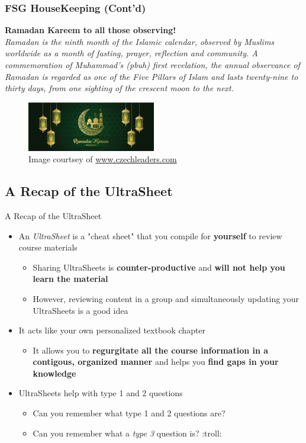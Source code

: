 \documentclass[hyperref={colorlinks,citecolor=blue,linkcolor=blue,urlcolor=blue}, aspectratio=1610]{beamer}
\begin{document}
\begin{frame}
  \frametitle{FSG HouseKeeping (Cont'd)}
  \textbf{Ramadan Kareem to all those observing!}\\
  \textit{Ramadan is the ninth month of the Islamic calendar, observed by Muslims worldwide as a month of fasting, prayer, reflection and community. A commemoration of Muhammad's (pbuh) first revelation, the annual observance of Ramadan is regarded as one of the Five Pillars of Islam and lasts twenty-nine to thirty days, from one sighting of the crescent moon to the next.} \\
  \centering
  \begin{figure}
    \includegraphics[width=0.5\textwidth]{ramadan_kareem.jpg}
    \caption{Image courtsey of \href{www.czechleaders.com}{www.czechleaders.com}}    
  \end{figure}
\end{frame}

\subsection{A Recap of the UltraSheet\texttrademark{}}
\begin{frame}{A Recap of the UltraSheet\texttrademark{}}
  \begin{itemize}
    \item An \textit{UltraSheet\texttrademark{}} is a "cheat sheet" that you compile for \textbf{yourself} to review course materials 
    \begin{itemize}
      \item Sharing UltraSheets\texttrademark{} is \textbf{counter-productive} and \textbf{will not help you learn the material}
      \item However, reviewing content in a group and simultaneously updating your UltraSheets\texttrademark{} is a good idea
    \end{itemize}
    \item It acts like your own personalized textbook chapter
    \begin{itemize}
      \item It allows you to \textbf{regurgitate all the course information in a contigous, organized manner} and helps you \textbf{find gaps in your knowledge}
    \end{itemize}
    \item UltraSheets\texttrademark{} help with type 1 and 2 questions 
    \begin{itemize}
      \item Can you remember what type 1 and 2 questions are?
      \item Can you remember what a \textit{type 3} question is? :troll:
    \end{itemize}
  \end{itemize}

\end{frame}
\end{document}
